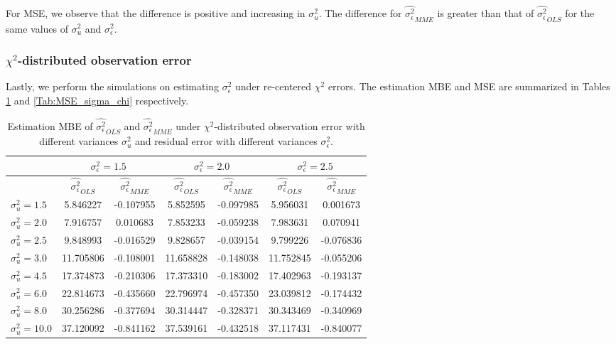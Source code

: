\documentclass{article}
\begin{document}
For MSE, we observe that the difference is positive and increasing in $\sigma^2_u$.
The difference for $\hat{\sigma^2_\epsilon}_{MME}$ is greater than that of $\hat{\sigma^2_\epsilon}_{OLS}$ for the same values of $\sigma^2_u$ and $\sigma^2_\epsilon$.

\subsubsection{$\chi^2$-distributed observation error}

Lastly, we perform the simulations on estimating $\sigma^2_\epsilon$ under re-centered $\chi^2$ errors.
The estimation MBE and MSE are summarized in Tables \ref{Tab:MBE_sigma_chi} and \ref{Tab:MSE_sigma_chi} respectively.

\begin{table}[ht]
    \centering
    \caption{Estimation MBE of $\hat{\sigma^2_\epsilon}_{OLS}$ and $\hat{\sigma^2_\epsilon}_{MME}$ under $\chi^2$-distributed observation error with different variances $\sigma^2_u$ and residual error with different variances $\sigma^2_\epsilon$.}
    \label{Tab:MBE_sigma_chi}
    \begin{tabular}[t]{lcccccc}
        \hline
        &\multicolumn{2}{c}{$\sigma^2_\epsilon=1.5$}&\multicolumn{2}{c}{$\sigma^2_\epsilon=2.0$}&\multicolumn{2}{c}{$\sigma^2_\epsilon=2.5$}\\
        \hline
        &$\hat{\sigma^2_\epsilon}_{OLS}$&$\hat{\sigma^2_\epsilon}_{MME}$&$\hat{\sigma^2_\epsilon}_{OLS}$&
        $\hat{\sigma^2_\epsilon}_{MME}$&$\hat{\sigma^2_\epsilon}_{OLS}$&$\hat{\sigma^2_\epsilon}_{MME}$\\
        \hline
        $\sigma^2_u = 1.5$&5.846227&-0.107955&5.852595&-0.097985&5.956031&0.001673\\
        $\sigma^2_u = 2.0$&7.916757&0.010683&7.853233&-0.059238&7.983631&0.070941\\
        $\sigma^2_u = 2.5$&9.848993&-0.016529&9.828657&-0.039154&9.799226&-0.076836\\
        $\sigma^2_u = 3.0$&11.705806&-0.108001&11.658828&-0.148038&11.752845&-0.055206\\
        $\sigma^2_u = 4.5$&17.374873&-0.210306&17.373310&-0.183002&17.402963&-0.193137\\
        $\sigma^2_u = 6.0$&22.814673&-0.435660&22.796974&-0.457350&23.039812&-0.174432\\
        $\sigma^2_u = 8.0$&30.256286&-0.377694&30.314447&-0.328371&30.343469&-0.340969\\
        $\sigma^2_u = 10.0$&37.120092&-0.841162&37.539161&-0.432518&37.117431&-0.840077\\
        \hline
    \end{tabular}
\end{table}
\end{document}
